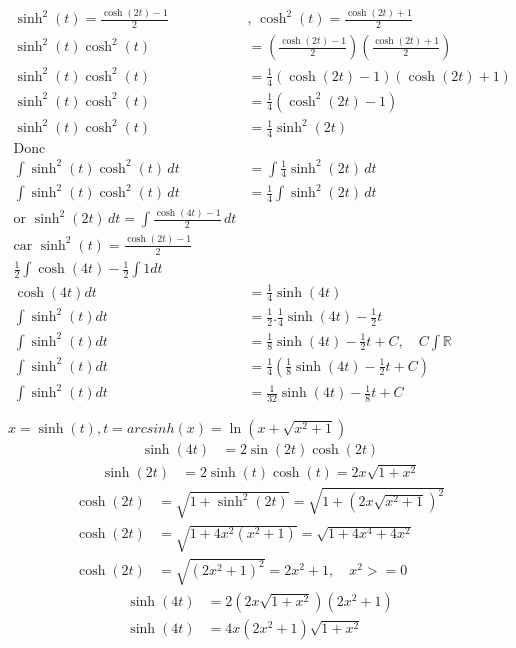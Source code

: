 \begin{align*}
	\sinh^2(t) = \frac{\cosh(2t) - 1}{2} \quad &\text{, }\cosh^2(t) = \frac{\cosh(2t) + 1}{2} \\
	\sinh^2(t)\cosh^2(t) &= (\frac{\cosh(2t) - 1}{2})(\frac{\cosh(2t) + 1}{2}) \\
	\sinh^2(t)\cosh^2(t) &= \frac{1}{4}(\cosh(2t) - 1)(\cosh(2t) + 1) \\
	\sinh^2(t)\cosh^2(t) &= \frac{1}{4}(\cosh^2(2t) - 1) \\
	\sinh^2(t)\cosh^2(t) &= \frac{1}{4} \sinh^2(2t) \\
	\text{Donc} \\	
	\int \sinh^2(t)\cosh^2(t) \, dt &= \int \frac{1}{4} \sinh^2(2t) \, dt \\
	\int \sinh^2(t)\cosh^2(t) \, dt &= \frac{1}{4}\int \sinh^2(2t) \, dt \\
	\text{or } \sinh^2(2t) \, dt = \int \frac{\cosh(4t) -1}{2} \, dt \\
	\text{car } \sinh^2(t) = \frac{\cosh(2t) -1}{2} \\
	\frac{1}{2} \int \cosh(4t) - \frac{1}{2} \int 1 dt \\
	\cosh(4t)dt &= \frac{1}{4} \sinh(4t) \\
	\int \sinh^2(t) dt &= \frac{1}{2} . \frac{1}{4} \sinh(4t) - \frac{1}{2}t \\
	\int \sinh^2(t) dt &= \frac{1}{8} \sinh(4t) - \frac{1}{2}t + C, \quad C \int \mathbb{R} \\
	\int \sinh^2(t) dt &=  \frac{1}{4} (\frac{1}{8} \sinh(4t) - \frac{1}{2}t  + C) \\
	\int \sinh^2(t) dt &= \frac{1}{32} \sinh(4t) - \frac{1}{8}t + C
\end{align*}

$x = \sinh(t), t = arcsinh(x) = \ln(x + \sqrt{x^2 + 1})$
\begin{align*}
	\sinh(4t) &= 2 \sin(2t) \cosh(2t)
\end{align*}
\begin{align*}
	\sinh(2t) &= 2 \sinh(t) \cosh(t) = 2x \sqrt{1 + x^2}
\end{align*}
\begin{align*}
	\cosh(2t) &= \sqrt{1 + \sinh^2(2t)} = \sqrt{1 + (2x\sqrt{x^2 + 1})^2} \\
	\cosh(2t) &= \sqrt{1 + 4x^2(x^2 +1)} = \sqrt{1 + 4x^4 + 4x^2} \\
	\cosh(2t) &= \sqrt{(2x^2+1)^2} = 2x^2 + 1, \quad x^2 >=0
\end{align*}
\begin{align*}
	\sinh(4t) &= 2(2x \sqrt{1 + x^2}) (2x^2 + 1) \\
	\sinh(4t) &= 4x(2x^2 + 1)\sqrt{1 + x^2}
\end{align*}



